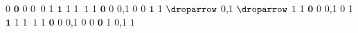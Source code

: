 0 $\mathbf{0}$ 0       0       $\:0$
1 $\mathbf{1}$ 1       1       $\:1$
1 $\mathbf{0}$ 0     {0,1}     $\boxed{0}$
0 $\mathbf{1}$ 1  $\droparrow$   {0,1}  $\droparrow$   $\boxed{1}$
1 $\mathbf{0}$ 0     {0,1}     $\boxed{0}$
1 $\mathbf{1}$ 1       1       $\:1$
1 $\mathbf{0}$ 0     {0,1}     $\boxed{0}$
0 $\mathbf{0}$ 1     {0,1}     $\boxed{1}$

